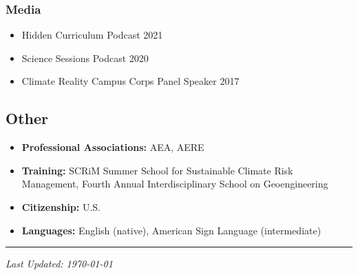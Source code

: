 \documentclass[12pt]{res} %
\begin{document}
\begin{resume}
\vspace{-.2in}

\subsubsection{Media}
\begin{itemize} %
	\item[] Hidden Curriculum Podcast \hfill 2021
	\item[] Science Sessions Podcast \hfill 2020
	\item[] Climate Reality Campus Corps Panel Speaker \hfill 2017
\end{itemize}
\subsection{Other}

\begin{itemize}
	\item[] \textbf{Professional Associations:} AEA, AERE
	\item[] \textbf{Training:} SCRiM Summer School for Sustainable Climate Risk Management, Fourth Annual Interdisciplinary School on Geoengineering
	\item[] \textbf{Citizenship:} U.S.
	\item[] \textbf{Languages:} English (native), American Sign Language (intermediate)
\end{itemize}
\hrule

\vspace{0.1in} %



\centerline{\emph{Last Updated: \today}}
\pagebreak



\end{resume}
\end{document}

